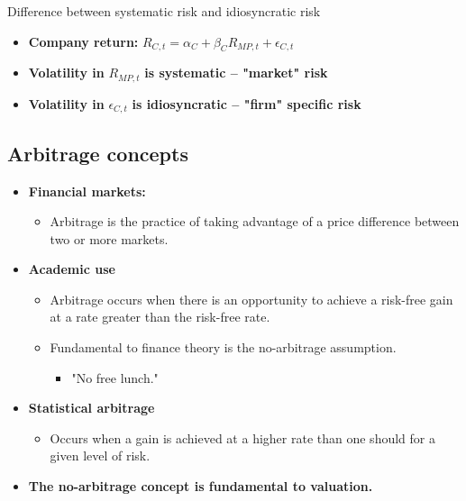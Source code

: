     \begin{example}
        Difference between systematic risk and idiosyncratic risk 

        \begin{itemize}
            \item \textbf{Company return:} \( R_{C,t} = \alpha_C + \beta_C R_{MP,t} + \epsilon_{C,t} \)
            \item \textbf{Volatility in} \( R_{MP,t} \) \textbf{is systematic – "market" risk}
            \item \textbf{Volatility in} \( \epsilon_{C,t} \) \textbf{is idiosyncratic – "firm" specific risk}
        \end{itemize}
    \end{example}

\subsection{Arbitrage concepts}
\begin{terminology}
    \begin{itemize}
        \item \textbf{Financial markets:}
        \begin{itemize}
            \item Arbitrage is the practice of taking advantage of a price difference between two or more markets.
        \end{itemize}
    
        \item \textbf{Academic use}
        \begin{itemize}
            \item Arbitrage occurs when there is an opportunity to achieve a risk-free gain at a rate greater than the risk-free rate.
            \item Fundamental to finance theory is the no-arbitrage assumption.
            \begin{itemize}
                \item "No free lunch."
            \end{itemize}
        \end{itemize}
    
        \item \textbf{Statistical arbitrage}
        \begin{itemize}
            \item Occurs when a gain is achieved at a higher rate than one should for a given level of risk.
        \end{itemize}
    
        \item \textbf{The no-arbitrage concept is fundamental to valuation.}
    \end{itemize}
\end{terminology}

